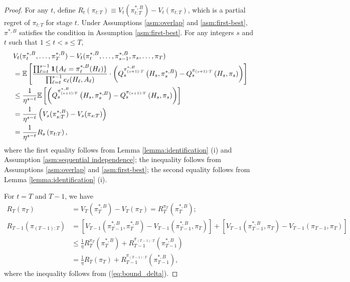 \begin{proof}
For any $t$, define $R_{t}(\pi_{t:T})  \equiv  V_{t}(\pi_{t:T}^{\ast,B}) - V_{t}(\pi_{t:T})$, which is a partial regret of $\pi_{t:T}$ for stage $t$. Under Assumptions \ref{asm:overlap} and \ref{asm:first-best}, $\pi^{\ast,B}$ satisfies the condition in Assumption \ref{asm:first-best}.
For any integers $s$ and $t$ such that $1 \leq t < s \leq T$,
\begin{align}
    &V_{t}(\pi_{t}^{\ast,B},\ldots,\pi_{T}^{\ast,B}) - V_{t}(\pi_{t}^{\ast,B},\ldots,\pi_{s-1}^{\ast,B},\pi_{s},\ldots,\pi_{T}) \nonumber \\
    &= \mathbb{E}\left[\frac{\prod_{\ell=t}^{s-1}\mathbf{1}\{A_{\ell}=\pi_{\ell}^{\ast,B}(H_{\ell})\}}{\prod_{\ell=t}^{s-1}e_{\ell}(H_{\ell},A_{\ell})}\cdot \left(Q_{s}^{\pi_{(s+1):T}^{\ast,B}}\left(H_{s},\pi_{s}^{\ast,B}\right) - Q_{s}^{\pi_{(s+1):T}}\left(H_{s},\pi_{s}\right)\right)\right] \nonumber \\
      &\leq \frac{1}{\eta^{s-t}} \mathbb{E}\left[\left(Q_{s}^{\pi_{(s+1):T}^{\ast,B}}\left(H_{s},\pi_{s}^{\ast,B}\right) - Q_{s}^{\pi_{(s+1):T}}\left(H_{s},\pi_{s}\right)\right)\right]  \nonumber \\
            &= \frac{1}{\eta^{s-t}} \left(V_{s}(\pi_{s:T}^{\ast,B}) - V_{s}(\pi_{s:T})\right) \nonumber \\
    &= \frac{1}{\eta^{s-t}}R_{s}\left(\pi_{t:T}\right), \label{eq:bound_delta}
\end{align}
where the first equality follows from Lemma \ref{lemma:identification} (i) and Assumption \ref{asm:sequential independence}; the inequality follows from Assumptions \ref{asm:overlap} and \ref{asm:first-best}; the second equality follows from Lemma \ref{lemma:identification} (i).

For $t=T$ and $T-1$, we have
\begin{align*}
R_{T}(\pi_T) &= V_{T}(\pi_{T}^{\ast,B}) - V_{T}(\pi_{T}) = R_{T}^{\pi_{T}}(\pi_{T}^{\ast,B});  \\
   R_{T-1}\left(\pi_{(T-1):T}\right) &= \left[V_{T-1}\left(\pi_{T-1}^{\ast,B},\pi_{T}^{\ast,B}\right) - V_{T-1}\left(\pi_{T-1}^{\ast,B},\pi_{T}\right) \right]
   + \left[V_{T-1}\left(\pi_{T-1}^{\ast,B},\pi_{T}\right) - V_{T-1}\left(\pi_{T-1},\pi_{T}\right)\right] \\
   &\leq \frac{1}{\eta}R_{T}^{\pi_{T}}(\pi_{T}^{\ast,B}) + R_{T-1}^{\pi_{(T-1):T}}\left(\pi_{T-1}^{\ast,B}\right) \\
   &= \frac{1}{\eta}R_T(\pi_{T}) + R_{T-1}^{\pi_{(T-1):T}}\left(\pi_{T-1}^{\ast,B}\right),
\end{align*}
where the inequality follows from (\ref{eq:bound_delta}).


\end{proof}
